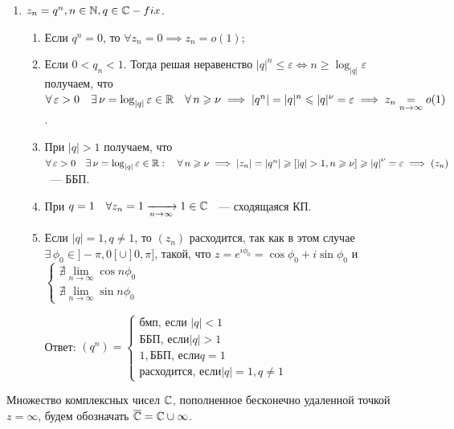 \documentclass[../../main.tex]{subfiles}
\begin{document}
\begin{exmp}
	\;
	\begin{enumerate}
		\item $ z_n = q^n, n \in \mathbb{N}, q \in \mathbb{C} - fix $.
		
		\begin{enumerate}
			\item Если $ q^n = 0 $, то $ \forall z_n = 0 \implies z_n = o(1) $;
			
			\item Если $ 0 < q_n < 1 $. Тогда решая неравенство $ |q|^n \leq \varepsilon \iff n \geq \log_{|q|}\varepsilon $ получаем, что $ \forall\, \varepsilon > 0 \quad \exists\, \nu = \log_{|q|}\varepsilon \in \mathbb{R} \quad \forall\, n \geqslant \nu \implies |q^n| = |q|^n \leqslant |q|^\nu = \varepsilon \implies z_n \underset{n \to \infty}{=} o(1) $.
			
			\item При $ |q| > 1 $ получаем, что $ \forall\, \varepsilon > 0 \quad \exists\, \nu = \log_{|q|}\varepsilon \in \mathbb{R}: \quad \forall\, n \geqslant \nu \implies |z_n| = |q^n| \geqslant [|q| > 1, n \geqslant \nu] \geqslant {|q|}^{\nu} = \varepsilon \implies (z_n) $ ~--- ББП.
			
			\item При $ q = 1 \quad \forall z_n = 1 \xrightarrow[n \rightarrow \infty]{} 1 \in \mathbb{C} $ ~--- сходящаяся КП.
			
			\item Если $ |q| = 1, q \neq 1 $, то $ (z_n) $ расходится, так как в этом случае $ \exists\, \phi_0 \in ]-\pi, 0[ \cup ]0, \pi] $, такой, что $ z = e^{i\phi_0} = \cos{\phi_0} + i\sin{\phi_0} $ и 
			$ \begin{cases}
				\nexists \underset{n \to \infty}{\lim} \cos{n\phi_0} \\
				\nexists \underset{n \to \infty}{\lim} \sin{n\phi_0}
			\end{cases} $
			
			Ответ: 
			$ (q^n) = \begin{cases}
				\text{бмп, если } |q| < 1 \\
				\text{ББП, если} |q| > 1 \\
				1, \text{ББП, если} q = 1 \\
				\text{расходится, если} |q| = 1, q \neq 1
			\end{cases} $
		\end{enumerate}
	\end{enumerate}
\end{exmp}

Множество комплексных чисел $ \mathbb{C} $, пополненное бесконечно удаленной точкой $ z = \infty $, будем обозначать $ \overline{\mathbb{C}} = \mathbb{C} \cup {\infty} $.
\end{document}
